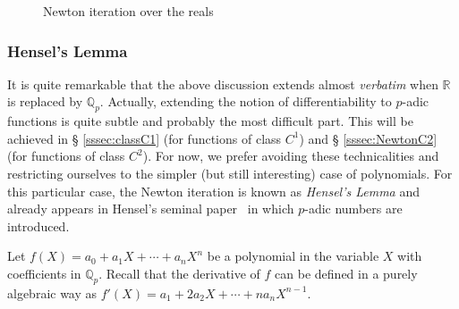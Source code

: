 \documentclass[11pt]{article}
\numberwithin{equation}{section}
\numberwithin{figure}{section}
\theoremstyle{definition}
\newcommand{\Q}{\mathbb Q}
\newcommand{\Qp}{\Q_p}
\newcommand{\R}{\mathbb R}
\begin{document}
\begin{figure}
\hfill
{}
\hfill\null

\caption{Newton iteration over the reals}
\label{fig:Newtoniter}
\end{figure}

\subsubsection{Hensel's Lemma}
\label{sssec:hensel}

It is quite remarkable that the above discussion extends almost 
\emph{verbatim} when $\R$ is replaced by $\Qp$. Actually, extending the 
notion of differentiability to $p$-adic functions is quite subtle and 
probably the most difficult part. This will be achieved in \S 
\ref{sssec:classC1} (for functions of class $C^1$) and \S 
\ref{sssec:NewtonC2} (for functions of class $C^2$). For now, we prefer 
avoiding these technicalities and restricting ourselves to the simpler 
(but still interesting) case of polynomials. For this particular case, 
the Newton iteration is known as \emph{Hensel's Lemma} and already 
appears in Hensel's seminal paper~\cite{He97} in which $p$-adic 
numbers are introduced.

Let $f(X) = a_0 + a_1 X + \cdots + a_n X^n$ be a polynomial in the 
variable $X$ with coefficients in $\Qp$. Recall that the derivative 
of $f$ can be defined in a purely algebraic way as $f'(X) = a_1 + 
2 a_2 X + \cdots + n a_n X^{n-1}$.
\end{document}
